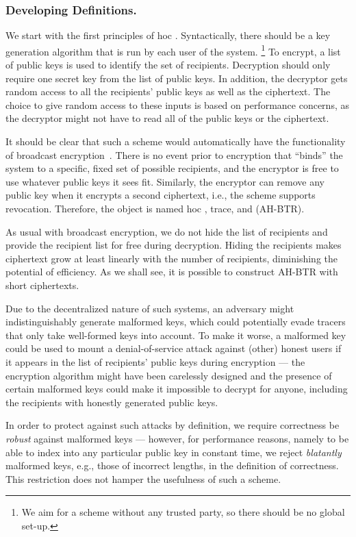 \subsubsection{Developing Definitions.}
We start with the first principles of \ad hoc .
Syntactically, there should be a key generation algorithm that is run by each user of the system.%
\footnote{We aim for a scheme without any trusted party, so there should be no global set-up.}
To encrypt, a list of public keys is used to identify the set of recipients.
Decryption should only require one secret key from the list of public keys.
In addition, the decryptor gets random access to all the recipients' public keys as well as the ciphertext.
The choice to give random access to these inputs is based on performance concerns, as the decryptor might not have to read all of the public keys or the ciphertext.

It should be clear that such a scheme would automatically have the functionality of broadcast encryption~\cite{C:FiaNao93}.
There is no event prior to encryption that ``binds'' the system to a specific, fixed set of possible recipients, and the encryptor is free to use whatever public keys it sees fit.
Similarly, the encryptor can remove any public key when it encrypts a second ciphertext, i.e., the scheme supports revocation.
Therefore, the object is named \ad hoc , trace, and  (AH-BTR).

As usual with broadcast encryption, we do not hide the list of recipients
and
provide the recipient list for free during decryption.
Hiding the recipients makes ciphertext
grow at least linearly with the number of recipients,
diminishing the potential of efficiency.
As we shall see, it is possible to construct AH-BTR with short ciphertexts.

Due to the decentralized nature of such systems,
an adversary might indistinguishably generate malformed keys,
which could potentially evade tracers that only take well-formed keys into account.
To make it worse, a malformed key could be used to mount a denial-of-service attack against (other) honest users if it appears in the list of recipients' public keys during encryption ---
the encryption algorithm might have been carelessly designed and the presence of certain malformed keys could make it impossible to decrypt for anyone, including the recipients with honestly generated public keys.

In order to protect against such attacks by definition,
we require correctness be \emph{robust} against malformed keys ---
however, for performance reasons, namely to be able to index into any particular public key in constant time,
we reject \emph{blatantly} malformed keys, e.g., those of incorrect lengths, in the definition of correctness.
This restriction does not hamper the usefulness of such a scheme.

